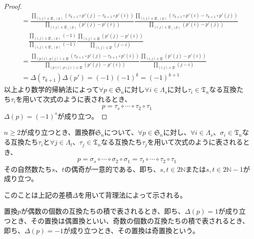 \documentclass[dvipdfmx]{jsarticle}
\begin{document}
\begin{proof}
\begin{align*}
&= \frac{\prod_{(i,j) \in \mathfrak{D}_{<}(p) } \left( \tau_{k + 1} \circ p'(j) - \tau_{k + 1} \circ p'(i) \right)}{\prod_{(i,j) \in \mathfrak{D}_{<}(p) } \left( p'(j) - p'(i) \right)}\frac{\prod_{(i,j) \in \mathfrak{D}_{>}(p) } \left( \tau_{k + 1} \circ p'(i) - \tau_{k + 1} \circ p'(j) \right)}{\prod_{(i,j) \in \mathfrak{D}_{>}(p) } \left( p'(i) - p'(j) \right)} \\
&\quad \frac{\prod_{(i,j) \in \mathfrak{D}_{>}(p) } ( - 1)}{\prod_{(i,j) \in \mathfrak{D}_{>}(p) } ( - 1)}\frac{\prod_{(i,j)\in \mathfrak{D} } \left( p'(j) - p'(i) \right)}{\prod_{(i,j)\in \mathfrak{D} } (j - i)}\\
&= \frac{\prod_{\left( p(i),p(j) \right)\in \mathfrak{D} } \left( \tau_{k + 1} \circ p'(j) - \tau_{k + 1} \circ p'(i) \right)}{\prod_{\left( p(i),p(j) \right)\in \mathfrak{D} } \left( p'(j) - p'(i) \right)}\frac{\prod_{(i,j)\in \mathfrak{D} } \left( p'(j) - p'(i) \right)}{\prod_{(i,j)\in \mathfrak{D} } (j - i)}\\
&= \varDelta\left( \tau_{k + 1} \right)\varDelta\left( p' \right) = ( - 1)( - 1)^{k} = ( - 1)^{k + 1}
\end{align*}
以上より数学的帰納法によって$\forall p \in \mathfrak{S}_{n}$に対し$\forall i \in \varLambda_{s}$に対し$\tau_{i} \in \mathfrak{T}_{n}$なる互換たち$\tau_{i}$を用いて次式のように表されるとき、
\begin{align*}
p = \tau_{s} \circ \cdots \circ \tau_{2} \circ \tau_{1}
\end{align*}
$\varDelta(p) = ( - 1)^{s}$が成り立つ。
\end{proof}
\begin{thm}\label{2.1.10.5}
$n \geq 2$が成り立つとき、置換群$\mathfrak{S}_{n}$について、$\forall p \in \mathfrak{S}_{n}$に対し、$\forall i \in \varLambda_{s}$、$\sigma_{i} \in \mathfrak{T}_{n}$なる互換たち$\tau_{i}$と$\forall j \in \varLambda_{t}$、$\tau_{j} \in \mathfrak{T}_{n}$なる互換たち$\tau_{j}$を用いて次式のように表されるとき、
\begin{align*}
p = \sigma_{s} \circ \cdots \circ \sigma_{2} \circ \sigma_{1} = \tau_{t} \circ \cdots \circ \tau_{2} \circ \tau_{1}
\end{align*}
その自然数たち$s、t$の偶奇が一意的である、即ち、$s,t \in 2\mathbb{N}$または$s,t \in 2\mathbb{N} - 1$が成り立つ。
\end{thm}\par
このことは上記の差積$\varDelta$を用いて背理法によって示される。
\begin{dfn}
置換$p$が偶数の個数の互換たちの積で表されるとき、即ち、$\varDelta(p) = 1$が成り立つとき、その置換は偶置換といい、奇数の個数の互換たちの積で表されるとき、即ち、$\varDelta(p) = - 1$が成り立つとき、その置換は奇置換という。
\end{dfn}
\end{document}
